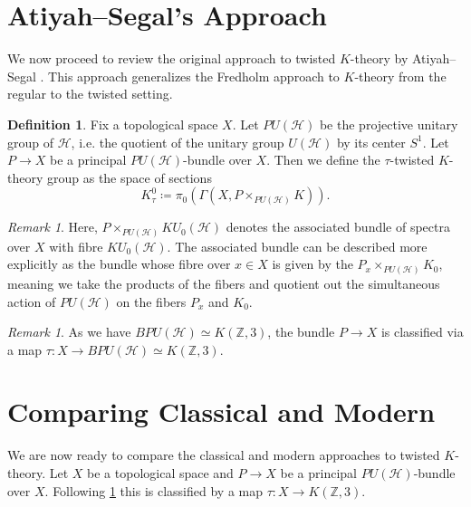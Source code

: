 \documentclass[a4paper]{book}
\newcommand{\lH}{\mathcal{H}}
\newcommand{\bZ}{\mathbb{Z}}
\theoremstyle{definition}
\newtheorem{definition}[equation]{Definition}
\theoremstyle{remark}
\newtheorem{remark}[equation]{Remark}
\numberwithin{equation}{section}
\begin{document}
\section{Atiyah--Segal's Approach}
We now proceed to review the original approach to twisted $K$-theory by Atiyah--Segal \cite{atiyahsegal2004twistedktheory}. This approach generalizes the Fredholm approach to $K$-theory from the regular to the twisted setting. 

\begin{definition} \label{def:twisted_K_theory_atiyah}
 Fix a topological space $X$. Let $PU(\lH)$ be the projective unitary group of $\lH$, i.e. the quotient of the unitary group $U(\lH)$ by its center $S^1$. Let $P \to X$ be a principal $PU(\lH)$-bundle over $X$. Then we define the $\tau$-twisted $K$-theory group as the space of sections
	\[K^0_\tau \coloneq \pi_0(\Gamma(X,P \times_{PU(\lH)} K)). \]
\end{definition}

\begin{remark}
	Here, $P \times_{PU(\lH)} KU_0(\lH)$ denotes the associated bundle of spectra over $X$ with fibre $KU_0(\lH)$. The associated bundle can be described more explicitly as the bundle whose fibre over $x \in X$ is given by the $P_x \times_{PU(\lH)} K_0$, meaning we take the products of the fibers and quotient out the simultaneous action of $PU(\lH)$ on the fibers $P_x$ and $K_0$.
\end{remark}

\begin{remark} \label{rem:classifying_map}
	As we have $BPU(\lH) \simeq K(\bZ,3)$, the bundle $P \to X$ is classified via a map $\tau \colon X \to BPU(\lH) \simeq K(\bZ,3)$.
\end{remark}
 

\section{Comparing Classical and Modern}
We are now ready to compare the classical and modern approaches to twisted $K$-theory. Let $X$ be a topological space and $P \to X$ be a principal $PU(\lH)$-bundle over $X$. Following \cref{rem:classifying_map} this is classified by a map $\tau \colon X \to K(\bZ,3)$. 
\end{document}
